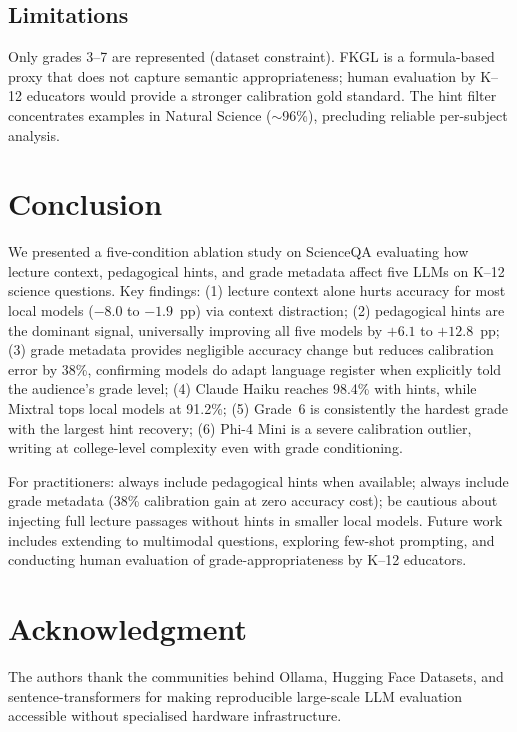 \documentclass[journal]{IEEEtran}
\begin{document}
\subsection{Limitations}

Only grades 3--7 are represented (dataset constraint). FKGL is a
formula-based proxy that does not capture semantic appropriateness; human
evaluation by K--12 educators would provide a stronger calibration gold
standard. The hint filter concentrates examples in Natural Science ($\sim$96\%),
precluding reliable per-subject analysis.

\section{Conclusion}
\label{sec:conclusion}

We presented a five-condition ablation study on ScienceQA evaluating how
lecture context, pedagogical hints, and grade metadata affect five LLMs on
K--12 science questions. Key findings: (1) lecture context alone hurts accuracy
for most local models ($-8.0$ to $-1.9$~pp) via context distraction; (2)
pedagogical hints are the dominant signal, universally improving all five
models by $+6.1$ to $+12.8$~pp; (3) grade metadata provides negligible
accuracy change but reduces calibration error by 38\%, confirming models do
adapt language register when explicitly told the audience's grade level;
(4) Claude Haiku reaches 98.4\% with hints, while Mixtral tops local models
at 91.2\%; (5) Grade~6 is consistently the hardest grade with the largest hint
recovery; (6) Phi-4 Mini is a severe calibration outlier, writing at
college-level complexity even with grade conditioning.

For practitioners: always include pedagogical hints when available; always
include grade metadata (38\% calibration gain at zero accuracy cost); be
cautious about injecting full lecture passages without hints in smaller local
models. Future work includes extending to multimodal questions, exploring
few-shot prompting, and conducting human evaluation of grade-appropriateness
by K--12 educators.

\section*{Acknowledgment}
The authors thank the communities behind Ollama, Hugging Face Datasets, and
sentence-transformers for making reproducible large-scale LLM evaluation
accessible without specialised hardware infrastructure.
\end{document}
